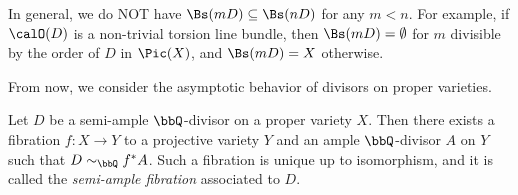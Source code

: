   \begin{remark}
    In general, we do NOT have $\Bs(mD) \subseteq \Bs (nD)$ for any $m < n$. 
    For example, if $\calO(D)$ is a non-trivial torsion line bundle, then $\Bs(mD) = \emptyset$ for $m$ divisible by the order of $D$ in $\Pic(X)$, and $\Bs(mD) = X$ otherwise.
  \end{remark}

  From now, we consider the asymptotic behavior of divisors on proper varieties.

  \begin{proposition}\label{thm:semi-ample_fibration}
    Let $D$ be a semi-ample $\bbQ$-divisor on a proper variety $X$.
    Then there exists a fibration $f: X \to Y$ to a projective variety $Y$ and an ample $\bbQ$-divisor $A$ on $Y$ such that $D \sim_\bbQ f^* A$.
    Such a fibration is unique up to isomorphism, and it is called the \emph{semi-ample fibration} associated to $D$.
  \end{proposition}
